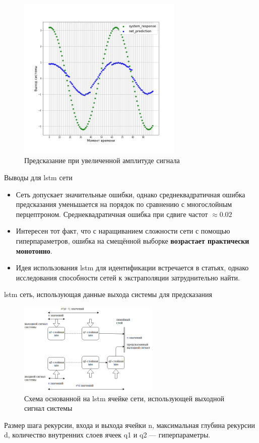 \documentclass{beamer}
\begin{document}
\begin{frame}
\begin{figure}[h]
\includegraphics[width=0.7\textwidth]{rnn_prediction_high_magnitude}
\caption{Предсказание при увеличенной амплитуде сигнала}
\end{figure}
\end{frame}

\begin{frame}{Выводы для lstm сети}
\begin{itemize}
\item Сеть допускает значительные ошибки, однако среднеквадратичная ошибка предсказания уменьшается на порядок по сравнению с многослойным перцептроном. Среднеквадратичная ошибка при сдвиге частот $\approx 0.02$
\item Интересен тот факт, что с наращиванием сложности сети с помощью гиперпараметров, ошибка на смещённой выборке \textbf{возрастает практически монотонно}. 
\item Идея использования lstm для идентификации встречается в статьях, однако исследования способности сетей к экстраполяции затруднительно найти.
\end{itemize}
\end{frame}

\begin{frame}{lstm сеть, использующая данные выхода системы для предсказания}
\begin{figure}[h]
    \centering
    \includegraphics[width=0.6\textwidth]{updated_rnn}
    \caption{Схема основанной на lstm ячейке сети, использующей выходной сигнал системы}
\end{figure}
Размер шага рекурсии, входа и выхода ячейки n, максимальная глубина рекурсии d, количество внутренних слоев ячеек q1 и q2 --- гиперпараметры.
\end{frame}
\end{document}
